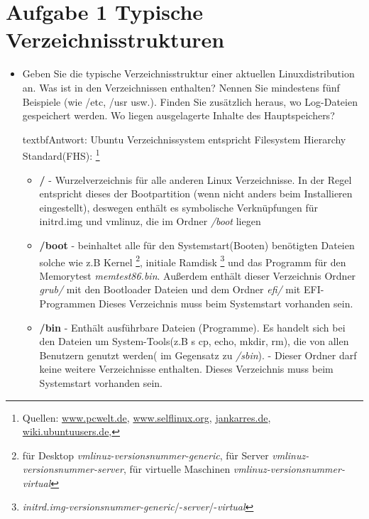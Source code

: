 \section{Aufgabe 1 Typische Verzeichnisstrukturen}
	\begin{itemize}
		\item Geben Sie die typische Verzeichnisstruktur einer aktuellen Linuxdistribution an. Was ist
		in den Verzeichnissen enthalten? Nennen Sie mindestens fünf Beispiele (wie /etc, /usr
		usw.). Finden Sie zusätzlich heraus, wo Log-Dateien gespeichert werden.
		Wo liegen ausgelagerte Inhalte des Hauptspeichers?

		textbf{Antwort}: Ubuntu Verzeichnissystem entspricht Filesystem Hierarchy Standard(FHS):
		\footnote{Quellen:
		\href{http://www.pcwelt.de/ratgeber/So_funktioniert_die_Linux-Ordnerstruktur-Everything_is_a_file-8772939.html}{www.pcwelt.de},
		\href{http://www.selflinux.org/selflinux/html/verzeichnisse_unter_linux01.html}{www.selflinux.org},
		\href{https://jankarres.de/2014/01/debian-linux-verzeichnisbaum-erklaert}{jankarres.de},
		\href{https://wiki.ubuntuusers.de/Verzeichnisstruktur}{wiki.ubuntuusers.de},
		}
		\begin{itemize}
			\item \textbf{/} - Wurzelverzeichnis für alle anderen Linux Verzeichnisse.
			 In der Regel entspricht dieses der Bootpartition (wenn nicht anders beim Installieren eingestellt),
			 deswegen enthält es symbolische Verknüpfungen für initrd.img und vmlinuz,
			 die im Ordner \textit{/boot} liegen
			 \item \textbf{/boot} - beinhaltet alle für den Systemstart(Booten) benötigten Dateien
			 solche wie z.B Kernel \footnote{
			 für Desktop \textit{vmlinuz-versionsnummer-generic},
			 für Server \textit{vmlinuz-versionsnummer-server},
			 für virtuelle Maschinen \textit{vmlinuz-versionsnummer-virtual}
			 }, initiale Ramdisk \footnote{
			 \textit{initrd.img-versionsnummer-generic}/-\textit{server}/-\textit{virtual}}
			 und das Programm für den Memorytest \textit{memtest86.bin}.
			 Außerdem enthält dieser Verzeichnis Ordner \textit{grub/} mit den Bootloader Dateien
			 und dem Ordner \textit{efi/} mit EFI-Programmen
			 Dieses Verzeichnis muss beim Systemstart vorhanden sein.
			\item \textbf{/bin} - Enthält ausführbare Dateien (Programme).
			Es handelt sich bei den Dateien um System-Tools(z.B s cp, echo, mkdir, rm), die von allen Benutzern
			genutzt werden( im Gegensatz zu \textit{/sbin}). - Dieser Ordner darf keine
			weitere Verzeichnisse enthalten. Dieses Verzeichnis muss beim Systemstart vorhanden sein.

\end{itemize}
\end{itemize}
